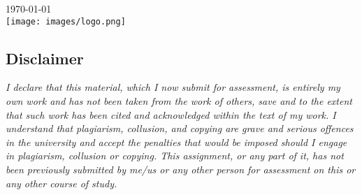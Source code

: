 \documentclass[11pt]{article}
\begin{document}
\begin{titlepage}


{\large \today}\\[2cm] %


\texttt{[image: images/logo.png]}\\[1cm] %
 

\vfill %

\end{titlepage}

\clearpage

\begin{center}
    \section*{Disclaimer} \label{disclaimer}
\end{center}

\emph{I declare that this material, which I now submit for assessment, is entirely my own work and has not been taken from the work of others, save and to the extent that such work has been cited and acknowledged within the text of my work. I understand that plagiarism, collusion, and copying are grave and serious offences in the university and accept the penalties that would be imposed should I engage in plagiarism, collusion or copying. This assignment, or any part of it, has not been previously submitted by me/us or any other person for assessment on this or any other course of study.}\\

\clearpage
\end{document}
